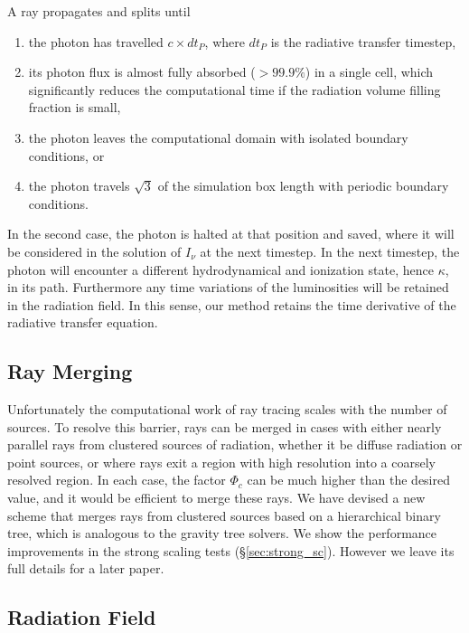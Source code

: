 \documentclass[12pt,preprint]{aastex}
\begin{document}
A ray propagates and splits until 
%
\begin{enumerate}
\item the photon has travelled $c \times dt_P$, where $dt_P$ is the
  radiative transfer timestep,
\item its photon flux is almost fully absorbed ($>99.9\%$) in a single
  cell, which significantly reduces the computational time if the
  radiation volume filling fraction is small,
\item the photon leaves the computational domain with isolated
  boundary conditions, or
\item the photon travels $\sqrt{3}$ of the simulation box length with
  periodic boundary conditions.
\end{enumerate}
%
In the second case, the photon is halted at that position and saved,
where it will be considered in the solution of $I_\nu$ at the next
timestep.  In the next timestep, the photon will encounter a different
hydrodynamical and ionization state, hence $\kappa$, in its path.
Furthermore any time variations of the luminosities will be retained
in the radiation field.  In this sense, our method retains the time
derivative of the radiative transfer equation.

\subsection{Ray Merging}

Unfortunately the computational work of ray tracing scales with the
number of sources.  To resolve this barrier, rays can be merged in
cases with either nearly parallel rays from clustered sources of
radiation, whether it be diffuse radiation or point sources, or where
rays exit a region with high resolution into a coarsely resolved
region.  In each case, the factor $\Phi_c$ can be much higher than the
desired value, and it would be efficient to merge these rays.  We have
devised a new scheme that merges rays from clustered sources based on
a hierarchical binary tree, which is analogous to the gravity tree
solvers.  We show the performance improvements in the strong scaling
tests (\S\ref{sec:strong_sc}).  However we leave its full details for
a later paper.

\subsection{Radiation Field}
\end{document}
